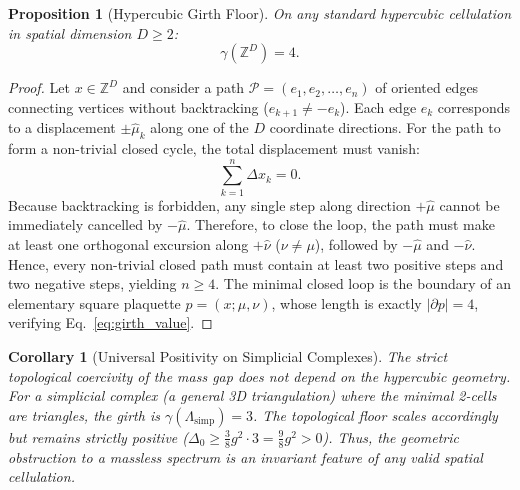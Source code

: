 \documentclass[11pt,reqno]{article}
\newtheorem{proposition}[theorem]{Proposition}
\newtheorem{corollary}[theorem]{Corollary}
\begin{document}
\begin{proposition}[Hypercubic Girth Floor]
\label{prop:girth_hypercubic}
On any standard hypercubic cellulation in spatial dimension $D \ge 2$:
\begin{equation}
    \label{eq:girth_value}
    \gamma(\mathbb{Z}^D) = 4.
\end{equation}
\end{proposition}
\begin{proof}
Let $x \in \mathbb{Z}^D$ and consider a path $\mathcal{P} = (e_1, e_2, \dots, e_n)$ of oriented edges connecting vertices without backtracking ($e_{k+1} \neq -e_k$).
Each edge $e_k$ corresponds to a displacement $\pm \hat{\mu}_k$ along one of the $D$ coordinate directions.
For the path to form a non-trivial closed cycle, the total displacement must vanish:
\begin{equation}
    \label{eq:path_closure}
    \sum_{k=1}^n \Delta x_k = 0.
\end{equation}
Because backtracking is forbidden, any single step along direction $+\hat{\mu}$ cannot be immediately cancelled by $-\hat{\mu}$.
Therefore, to close the loop, the path must make at least one orthogonal excursion along $+\hat{\nu}$ ($\nu \neq \mu$), followed by $-\hat{\mu}$ and $-\hat{\nu}$.
Hence, every non-trivial closed path must contain at least two positive steps and two negative steps, yielding $n \ge 4$.
The minimal closed loop is the boundary of an elementary square plaquette $p = (x; \mu, \nu)$, whose length is exactly $|\partial p| = 4$, verifying Eq.~\eqref{eq:girth_value}.
\end{proof}

\begin{corollary}[Universal Positivity on Simplicial Complexes]
\label{cor:simplicial_girth}
The strict topological coercivity of the mass gap does not depend on the hypercubic geometry. For a simplicial complex (a general 3D triangulation) where the minimal 2-cells are triangles, the girth is $\gamma(\Lambda_{\mathrm{simp}}) = 3$. The topological floor scales accordingly but remains strictly positive ($\Delta_0 \ge \frac{3}{8} g^2 \cdot 3 = \frac{9}{8} g^2 > 0$). Thus, the geometric obstruction to a massless spectrum is an invariant feature of any valid spatial cellulation.
\end{corollary}
\end{document}
